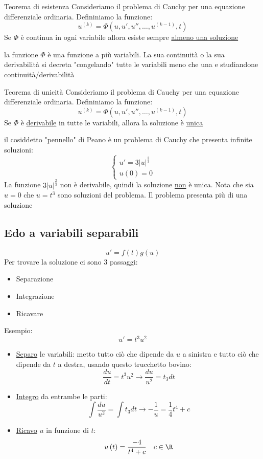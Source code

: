 \begin{teorema}{Teorema di esistenza}
	Consideriamo il problema di Cauchy per una equazione differenziale ordinaria. Defininiamo la funzione:
	\[
		u^{\left( k \right) }= \Phi \left( u, u',u'',\ldots,u^{\left( k-1 \right) },t \right)
	\]
	Se $ \Phi   $ è continua in ogni variabile allora esiste sempre \underline{almeno una soluzione}

\end{teorema}

la funzione $ \Phi $ è una funzione a più variabili. La sua continuità o la sua derivabilità si decreta "congelando" tutte le variabili meno che una e studiandone continuità/derivabilità
\begin{teorema}{Teorema di unicità}
	Consideriamo il problema di Cauchy per una equazione differenziale ordinaria. Defininiamo la funzione:
	\[
		u^{\left( k \right) }= \Phi \left( u, u',u'',\ldots,u^{\left( k-1 \right) },t \right)
	\]
	Se $ \Phi  $ è \underline{derivabile} in tutte le variabili, allora la soluzione è \underline{unica}

\end{teorema}
il cosiddetto "pennello" di Peano è un problema di Cauchy che presenta infinite soluzioni:
\[
	\begin{cases}
		u'= 3 \left|u\right|^{\frac{2}{3}} \\
		u\left( 0 \right) =0
	\end{cases}
\]
La funzione $ 3 \left|u\right|^{\frac{2}{3}} $ non è derivabile, quindi la soluzione \underline{non} è unica. Nota che sia $ u=0 $ che $ u=t^3 $ sono soluzioni del problema. Il problema presenta più di una soluzione
\subsection{Edo a variabili separabili}
\[
	u' = f\left( t \right) g\left( u \right)
\]
Per trovare la soluzione ci sono 3 passaggi:
\begin{itemize}
	\item Separazione
	\item Integrazione
	\item Ricavare
\end{itemize}
Esempio:
\[
	u' = t^3 u^2
\]
\begin{itemize}
	\item \underline{Separo} le variabili: metto tutto ciò che dipende da $ u $ a sinistra e tutto ciò che dipende da $ t $ a destra, usando questo trucchetto bovino:
	      \[
		      \frac{du}{dt}= t^3 u^2 \rightarrow \frac{du}{u^2}= t_3 dt
	      \]
	\item \underline{Integro} da entrambe le parti:
	      \[
		      \int \frac{du}{u^2}= \int t_3 dt \rightarrow - \frac{1}{u}= \frac{1}{4} t^{4} + c
	      \]
	\item \underline{Ricavo} $ u $ in funzione di $ t $:
	      \[
		      u\left( t \right) = \frac{- 4}{t ^{4} + c} \quad c \in  \R
	      \]
\end{itemize}
\hr

